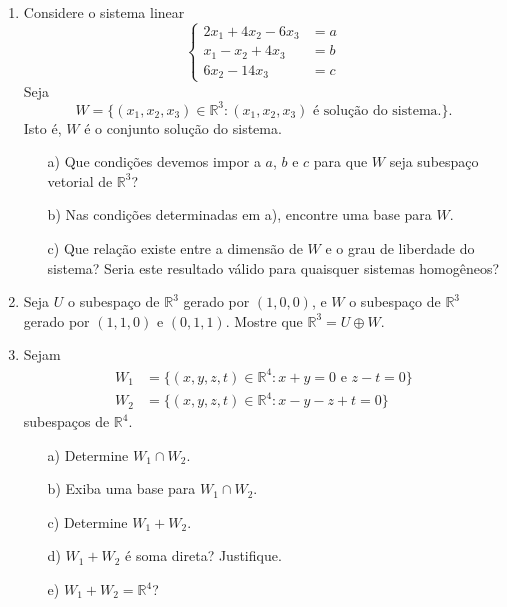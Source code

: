 \documentclass[12pt]{article}
\begin{document}
\begin{enumerate}
\item Considere o sistema linear
     \begin{equation*}
       \begin{cases}
         2x_1+4x_2-6x_3 & = a\\
         x_1-x_2+4x_3 &= b\\
         6x_2-14x_3 &= c
       \end{cases}
     \end{equation*}
     Seja 
     \begin{equation*}
       W = \{(x_1,x_2,x_3)\in {\mathbb{R}}^3 : (x_1,x_2,x_3) \text{ é solução do sistema.}\}.
     \end{equation*}
     Isto é, $W$ é o conjunto solução do sistema.
     \begin{itemize}
     \item[a)] Que condições devemos impor a $a$, $b$ e $c$ para que $W$ seja subespaço vetorial de ${\mathbb{R}}^3$?
     \item[b)] Nas condições determinadas em a), encontre uma base para $W$.
     \item[c)] Que relação existe entre a dimensão de $W$ e o grau de liberdade do sistema? Seria este resultado válido para quaisquer sistemas homogêneos?
     \end{itemize}

     \item Seja $U$ o subespaço de ${\mathbb{R}}^3$ gerado por $(1,0,0)$, e $W$ o subespaço de ${\mathbb{R}}^3$ gerado por $(1,1,0)$ e $(0,1,1)$. Mostre que ${\mathbb{R}}^3 = U \oplus W$.

     \item Sejam 
       \begin{align*}
         W_1 &= \{ (x,y,z,t) \in {\mathbb{R}}^4 : x+y=0 \text{ e } z-t=0\}\\
         W_2 &= \{(x,y,z,t) \in {\mathbb{R}}^4 : x-y-z+t=0\}
       \end{align*}
       subespaços de ${\mathbb{R}}^4$.
       \begin{itemize}
       \item[a)] Determine $W_1\cap W_2$.
       \item[b)] Exiba uma base para $W_1\cap W_2$.
       \item[c)] Determine $W_1+W_2$.
       \item[d)] $W_1+W_2$ é soma direta? Justifique.
       \item[e)] $W_1+W_2={\mathbb{R}}^4$?
       \end{itemize}


\end{enumerate}
\end{document}
